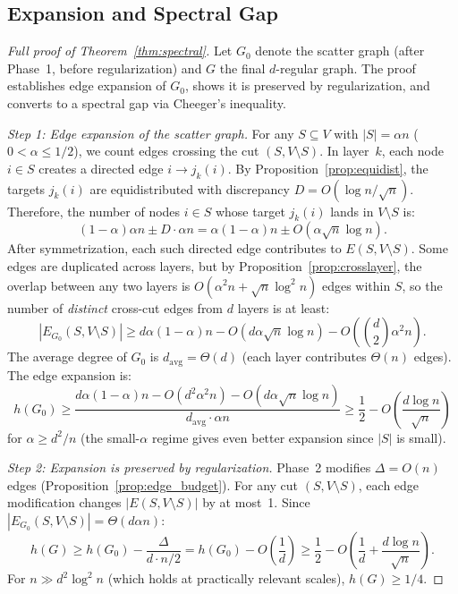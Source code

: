 \documentclass{article}
\begin{document}
\subsection{Expansion and Spectral Gap}

\begin{proof}[Full proof of Theorem~\ref{thm:spectral}]
Let $G_0$ denote the scatter graph (after Phase~1, before
regularization) and $G$ the final $d$-regular graph.  The proof
establishes edge expansion of $G_0$, shows it is preserved by
regularization, and converts to a spectral gap via Cheeger's
inequality.

\emph{Step 1: Edge expansion of the scatter graph.}
For any $S \subseteq V$ with $|S| = \alpha n$ ($0 < \alpha \le 1/2$),
we count edges crossing the cut $(S, V \setminus S)$.  In layer~$k$,
each node $i \in S$ creates a directed edge $i \to j_k(i)$.  By
Proposition~\ref{prop:equidist}, the targets $j_k(i)$ are
equidistributed with discrepancy $D = O(\log n / \sqrt{n})$.
Therefore, the number of nodes $i \in S$ whose target $j_k(i)$
lands in $V \setminus S$ is:
\[
(1 - \alpha) \alpha n \pm D \cdot \alpha n
= \alpha(1-\alpha)n \pm O(\alpha\sqrt{n}\log n).
\]
After symmetrization, each such directed edge contributes to
$E(S, V \setminus S)$.  Some edges are duplicated across layers,
but by Proposition~\ref{prop:crosslayer}, the overlap between any
two layers is $O(\alpha^2 n + \sqrt{n}\log^2 n)$ edges within $S$,
so the number of \emph{distinct} cross-cut edges from $d$ layers
is at least:
\[
|E_{G_0}(S, V\!\setminus\! S)| \ge d\alpha(1-\alpha)n
- O(d\alpha\sqrt{n}\log n) - O\!\left(\binom{d}{2}\alpha^2 n\right).
\]
The average degree of $G_0$ is $d_{\mathrm{avg}} = \Theta(d)$
(each layer contributes $\Theta(n)$ edges).  The edge expansion is:
\[
h(G_0) \ge \frac{d\alpha(1-\alpha)n - O(d^2\alpha^2 n) - O(d\alpha\sqrt{n}\log n)}
{d_{\mathrm{avg}} \cdot \alpha n}
\ge \frac{1}{2} - O\!\left(\frac{d\log n}{\sqrt{n}}\right)
\]
for $\alpha \ge d^2/n$ (the small-$\alpha$ regime gives even better
expansion since $|S|$ is small).

\emph{Step 2: Expansion is preserved by regularization.}
Phase~2 modifies $\Delta = O(n)$ edges (Proposition~\ref{prop:edge_budget}).
For any cut $(S, V \setminus S)$, each edge modification changes
$|E(S, V \setminus S)|$ by at most~1.  Since
$|E_{G_0}(S, V\!\setminus\! S)| = \Theta(d\alpha n)$:
\[
h(G) \ge h(G_0) - \frac{\Delta}{d \cdot n/2}
= h(G_0) - O\!\left(\frac{1}{d}\right)
\ge \frac{1}{2} - O\!\left(\frac{1}{d} + \frac{d\log n}{\sqrt{n}}\right).
\]
For $n \gg d^2\log^2 n$ (which holds at practically relevant scales),
$h(G) \ge 1/4$.


\end{proof}
\end{document}
